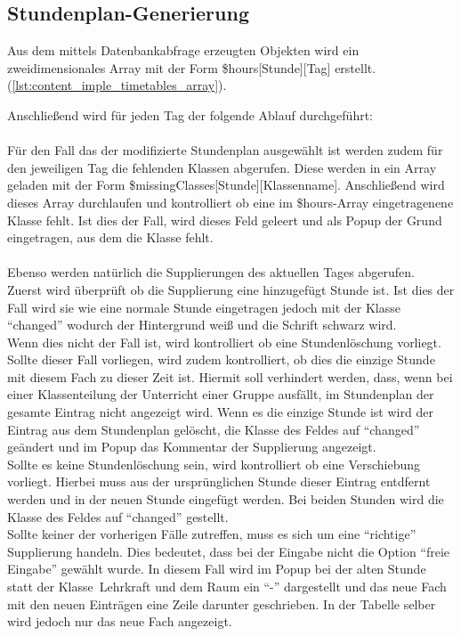 \subsection{Stundenplan-Generierung}

Aus dem mittels Datenbankabfrage erzeugten Objekten wird ein zweidimensionales Array mit der Form \$hours[Stunde][Tag] erstellt. (\autoref{lst:content_imple_timetables_array}).



Anschließend wird für jeden Tag der folgende Ablauf durchgeführt:\\\\

Für den Fall das der modifizierte Stundenplan ausgewählt ist werden zudem für den jeweiligen Tag die fehlenden Klassen abgerufen. Diese werden in ein Array geladen mit der Form \$missingClasses[Stunde][Klassenname]. Anschließend wird dieses Array durchlaufen und kontrolliert ob eine im \$hours-Array eingetragenene Klasse fehlt. Ist dies der Fall, wird dieses Feld geleert und als Popup der Grund eingetragen, aus dem die Klasse fehlt. \\\\
Ebenso werden natürlich die Supplierungen des aktuellen Tages abgerufen. \\
Zuerst wird überprüft ob die Supplierung eine hinzugefügt Stunde ist. Ist dies der Fall wird sie wie eine normale Stunde eingetragen jedoch mit der Klasse \enquote{changed} wodurch der Hintergrund weiß und die Schrift schwarz wird.\\
Wenn dies nicht der Fall ist, wird kontrolliert ob eine Stundenlöschung vorliegt. Sollte dieser Fall vorliegen, wird zudem kontrolliert, ob dies die einzige Stunde mit diesem Fach zu dieser Zeit ist. Hiermit soll verhindert werden, dass, wenn bei einer Klassenteilung der Unterricht einer Gruppe ausfällt, im Stundenplan der gesamte Eintrag nicht angezeigt wird. Wenn es die einzige Stunde ist wird der Eintrag aus dem Stundenplan gelöscht, die Klasse des Feldes auf \enquote{changed} geändert und im Popup das Kommentar der Supplierung angezeigt.\\
Sollte es keine Stundenlöschung sein, wird kontrolliert ob eine Verschiebung vorliegt. Hierbei muss aus der ursprünglichen Stunde dieser Eintrag entdfernt werden und in der neuen Stunde eingefügt werden. Bei beiden Stunden wird die Klasse des Feldes auf \enquote{changed} gestellt.\\
Sollte keiner der vorherigen Fälle zutreffen, muss es sich um eine \enquote{richtige} Supplierung handeln. Dies bedeutet, dass bei der Eingabe nicht die Option \enquote{freie Eingabe} gewählt wurde. In diesem Fall wird im Popup bei der alten Stunde statt der Klasse\ Lehrkraft und dem Raum ein \enquote{-} dargestellt und das neue Fach mit den neuen Einträgen eine Zeile darunter geschrieben. In der Tabelle selber wird jedoch nur das neue Fach angezeigt.

